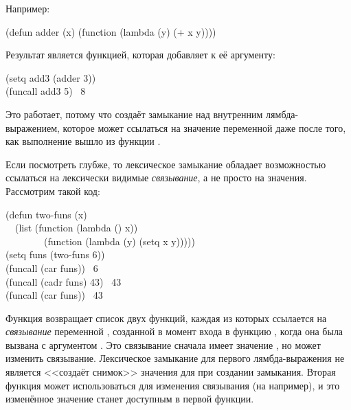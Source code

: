 \begin{defspec}
Например:
\begin{lisp}
(defun adder (x) (function (lambda (y) (+ x y))))
\end{lisp}
Результат  является функцией, которая добавляет  к её
аргументу:
\begin{lisp}
(setq add3 (adder 3)) \\
(funcall add3 5) \EV\ 8
\end{lisp}
Это работает, потому что  создаёт замыкание над внутренним
лямбда-выражением, которое может ссылаться на значение  переменной 
даже после того, как выполнение вышло из функции .

Если посмотреть глубже, то лексическое замыкание обладает возможностью ссылаться
на лексически видимые \emph{связывание}, а не просто на значения.
Рассмотрим такой код:
\begin{lisp}
(defun two-funs (x) \\
~~(list (function (lambda () x)) \\
~~~~~~~~(function (lambda (y) (setq x y))))) \\
(setq funs (two-funs 6)) \\
(funcall (car funs)) \EV\ 6 \\
(funcall (cadr funs) 43) \EV\ 43 \\
(funcall (car funs)) \EV\ 43
\end{lisp}
Функция  возвращает список двух функций, каждая из которых
ссылается на \emph{связывание} переменной , созданной в момент входа в
функцию , когда она была вызвана с аргументом .
Это связывание сначала имеет значение , но  может изменить
связывание. Лексическое замыкание для первого лямбда-выражения не является
<<создаёт снимок>> значения  для  при создании замыкания. Вторая
функция может использоваться для изменения связывания (на  например), и
это изменённое значение станет доступным в первой функции.


\end{defspec}
